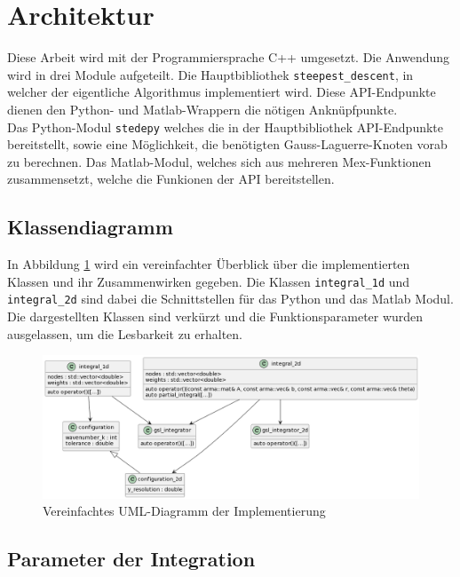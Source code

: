 \section{Architektur}

Diese Arbeit wird mit der Programmiersprache C++ umgesetzt.
Die Anwendung wird in drei Module aufgeteilt. 
Die Hauptbibliothek \texttt{steepest\_descent}, in welcher der eigentliche Algorithmus implementiert wird.
Diese API-Endpunkte dienen den Python- und Matlab-Wrappern die nötigen Anknüpfpunkte. 
\\
Das Python-Modul \texttt{stedepy} welches die in der Hauptbibliothek API-Endpunkte bereitstellt, sowie eine Möglichkeit, die benötigten Gauss-Laguerre-Knoten vorab zu berechnen.
Das Matlab-Modul, welches sich aus mehreren Mex-Funktionen zusammensetzt, welche die Funkionen der API bereitstellen.
\\
\subsection{Klassendiagramm}

In Abbildung \ref{uml} wird ein vereinfachter Überblick über die implementierten Klassen und ihr Zusammenwirken gegeben.
Die Klassen \texttt{integral\_1d} und \texttt{integral\_2d} sind dabei die Schnittstellen für das Python und das Matlab Modul.
Die dargestellten Klassen sind verkürzt und die Funktionsparameter wurden ausgelassen, um die Lesbarkeit zu erhalten.

\begin{figure}
    \includegraphics[width=\textwidth]{images/uml.png}
    \caption{Vereinfachtes UML-Diagramm der Implementierung}\label{uml}
\end{figure}

\pagebreak

\subsection{Parameter der Integration}

